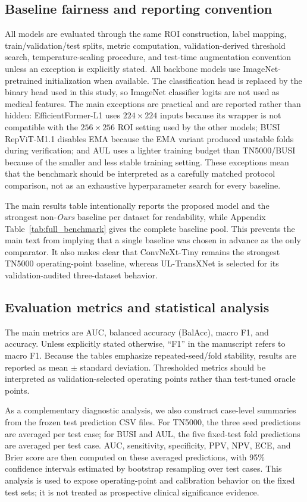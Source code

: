 \subsection{Baseline fairness and reporting convention}
All models are evaluated through the same ROI construction, label mapping, train/validation/test splits, metric computation, validation-derived threshold search, temperature-scaling procedure, and test-time augmentation convention unless an exception is explicitly stated. All backbone models use ImageNet-pretrained initialization when available. The classification head is replaced by the binary head used in this study, so ImageNet classifier logits are not used as medical features. The main exceptions are practical and are reported rather than hidden: EfficientFormer-L1 uses $224 \times 224$ inputs because its wrapper is not compatible with the $256 \times 256$ ROI setting used by the other models; BUSI RepViT-M1.1 disables EMA because the EMA variant produced unstable folds during verification; and AUL uses a lighter training budget than TN5000/BUSI because of the smaller and less stable training setting. These exceptions mean that the benchmark should be interpreted as a carefully matched protocol comparison, not as an exhaustive hyperparameter search for every baseline.

The main results table intentionally reports the proposed model and the strongest non-\textit{Ours} baseline per dataset for readability, while Appendix Table~\ref{tab:full_benchmark} gives the complete baseline pool. This prevents the main text from implying that a single baseline was chosen in advance as the only comparator. It also makes clear that ConvNeXt-Tiny remains the strongest TN5000 operating-point baseline, whereas UL-TransXNet is selected for its validation-audited three-dataset behavior.

\subsection{Evaluation metrics and statistical analysis}
The main metrics are AUC, balanced accuracy (BalAcc), macro F1, and accuracy. Unless explicitly stated otherwise, ``F1'' in the manuscript refers to macro F1. Because the tables emphasize repeated-seed/fold stability, results are reported as mean $\pm$ standard deviation. Thresholded metrics should be interpreted as validation-selected operating points rather than test-tuned oracle points.

As a complementary diagnostic analysis, we also construct case-level summaries from the frozen test prediction CSV files. For TN5000, the three seed predictions are averaged per test case; for BUSI and AUL, the five fixed-test fold predictions are averaged per test case. AUC, sensitivity, specificity, PPV, NPV, ECE, and Brier score are then computed on these averaged predictions, with 95\% confidence intervals estimated by bootstrap resampling over test cases. This analysis is used to expose operating-point and calibration behavior on the fixed test sets; it is not treated as prospective clinical significance evidence.

